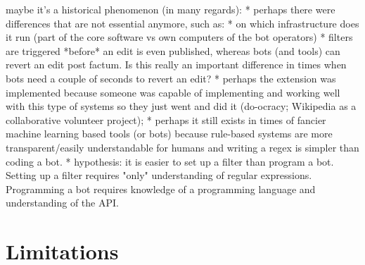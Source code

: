 maybe it's a historical phenomenon (in many regards):
* perhaps there were differences that are not essential anymore, such as:
  * on which infrastructure does it run (part of the core software vs own computers of the bot operators)
  * filters are triggered *before* an edit is even published, whereas bots (and tools) can revert an edit post factum. Is this really an important difference in times when bots need a couple of seconds to revert an edit?
* perhaps the extension was implemented because someone was capable of implementing and working well with this type of systems so they just went and did it (do-ocracy; Wikipedia as a collaborative volunteer project);
* perhaps it still exists in times of fancier machine learning based tools (or bots) because rule-based systems are more transparent/easily understandable for humans and writing a regex is simpler than coding a bot.
* hypothesis: it is easier to set up a filter than program a bot. Setting up a filter requires "only" understanding of regular expressions. Programming a bot requires knowledge of a programming language and understanding of the API.

\begin{comment}
Use as an argument in favor of filter came to be this way organically
\url{http://www.aaronsw.com/weblog/whorunswikipedia}
"But what’s less well-known is that it’s also the site that anyone can run. The vandals aren’t stopped because someone is in charge of stopping them; it was simply something people started doing. And it’s not just vandalism: a “welcoming committee” says hi to every new user, a “cleanup taskforce” goes around doing factchecking. The site’s rules are made by rough consensus. Even the servers are largely run this way — a group of volunteer sysadmins hang out on IRC, keeping an eye on things. Until quite recently, the Foundation that supposedly runs Wikipedia had no actual employees.
This is so unusual, we don’t even have a word for it. It’s tempting to say “democracy”, but that’s woefully inadequate. Wikipedia doesn’t hold a vote and elect someone to be in charge of vandal-fighting. Indeed, “Wikipedia” doesn’t do anything at all. Someone simply sees that there are vandals to be fought and steps up to do the job."
//yeah, I'd call it "do-ocracy"

\end{comment}

\section{Limitations}


